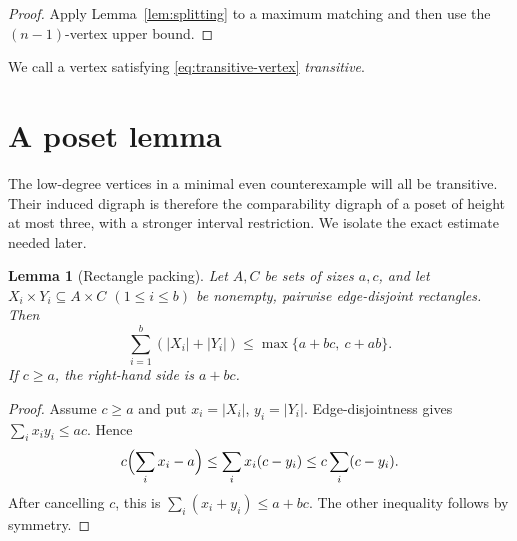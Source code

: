 \documentclass[11pt]{amsart}
\newtheorem{lemma}[theorem]{Lemma}
\theoremstyle{definition}
\begin{document}
\begin{proof}
Apply Lemma~\ref{lem:splitting} to a maximum matching and then use the
$(n-1)$-vertex upper bound.
\end{proof}

We call a vertex satisfying \eqref{eq:transitive-vertex}
\emph{transitive}.

\section{A poset lemma}

The low-degree vertices in a minimal even counterexample will all be
transitive.  Their induced digraph is therefore the comparability digraph
of a poset of height at most three, with a stronger interval restriction.
We isolate the exact estimate needed later.

\begin{lemma}[Rectangle packing]\label{lem:rectangles}
Let $A,C$ be sets of sizes $a,c$, and let
$X_i\times Y_i\subseteq A\times C$ $(1\le i\le b)$ be nonempty,
pairwise edge-disjoint rectangles.  Then
\[
 \sum_{i=1}^b (|X_i|+|Y_i|)
 \le \max\{a+bc,\ c+ab\}.
\]
If $c\ge a$, the right-hand side is $a+bc$.
\end{lemma}

\begin{proof}
Assume $c\ge a$ and put $x_i=|X_i|$, $y_i=|Y_i|$.
Edge-disjointness gives $\sum_i x_i y_i\le ac$.  Hence
\[
 c\Bigl(\sum_i x_i-a\Bigr)
 \le \sum_i x_i(c-y_i)
 \le c\sum_i(c-y_i).
\]
After cancelling $c$, this is
$\sum_i(x_i+y_i)\le a+bc$.  The other inequality follows by symmetry.
\end{proof}
\end{document}
